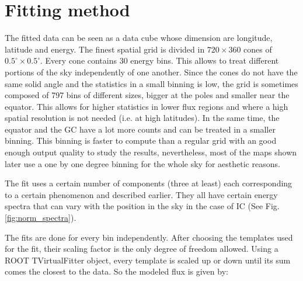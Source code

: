 
\newpage
\section{Fitting method}
\label{sec:fitting_method}


The fitted data can be seen as a data cube whose dimension are longitude, latitude and energy. The finest spatial grid is divided in $720 \times 360$ cones of $ 0.5^\circ \times 0.5^\circ $. Every cone contains 30 energy bins. This allows to treat different portions of the sky independently of one another.
Since the cones do not have the same solid angle and the statistics in a small binning is low, the grid is sometimes composed of 797 bins of different sizes, bigger at the poles and smaller near the equator. This allows for higher statistics in lower flux regions and where a high spatial resolution is not needed (i.e. at high latitudes). In the same time, the equator and the GC have a lot more counts and can be treated in a smaller binning. This binning is faster to compute than a regular grid with an good enough output quality to study the results, nevertheless, most of the maps shown later use a one by one degree binning for the whole sky for aesthetic reasons.

The fit uses a certain number of components (three at least) each corresponding to a certain phenomenon and described earlier. They all have certain energy spectra that can vary with the position in the sky in the case of IC (See Fig. \ref{fig:norm_spectra}).

The fits are done for every bin independently. After choosing the templates used for the fit, their scaling factor is the only degree of freedom allowed. Using a ROOT TVirtualFitter object, every template is scaled up or down until its sum comes the closest to the data. So the modeled flux is given by:

